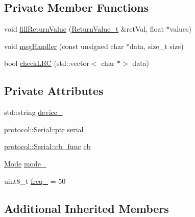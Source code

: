 \subsection*{Private Member Functions}
\begin{DoxyCompactItemize}
\item 
void \hyperlink{classo_cpt_1_1components_1_1sensors_1_1_razor_a1c058bfc9483cfcf94456d498bff380e}{fill\+Return\+Value} (\hyperlink{classo_cpt_1_1components_1_1sensors_1_1_razor_aab55c5b1a96ce97421e4696599549954}{Return\+Value\+\_\+t} \&ret\+Val, float $\ast$values)
\item 
void \hyperlink{classo_cpt_1_1components_1_1sensors_1_1_razor_a8d8e051113a86789851faca74d3da303}{msg\+Handler} (const unsigned char $\ast$data, size\+\_\+t size)
\item 
bool \hyperlink{classo_cpt_1_1components_1_1sensors_1_1_razor_a0905dcac63406a3885fa8c2d0e952a39}{check\+L\+RC} (std\+::vector$<$ char $\ast$$>$ data)
\end{DoxyCompactItemize}
\subsection*{Private Attributes}
\begin{DoxyCompactItemize}
\item 
std\+::string \hyperlink{classo_cpt_1_1components_1_1sensors_1_1_razor_af566e421b9ea1378e19cffd6bd743860}{device\+\_\+}
\item 
\hyperlink{classo_cpt_1_1protocol_1_1_serial_a4c97c6a2456d649974e07a186f634780}{protocol\+::\+Serial\+::ptr} \hyperlink{classo_cpt_1_1components_1_1sensors_1_1_razor_af9d445b2a06bbe42bb965c0e42b711df}{serial\+\_\+}
\item 
\hyperlink{classo_cpt_1_1protocol_1_1_serial_ad55591180be8bea2fe3832b1265b7496}{protocol\+::\+Serial\+::cb\+\_\+func} \hyperlink{classo_cpt_1_1components_1_1sensors_1_1_razor_a3fc69162ed59373f966458f2a5e30311}{cb}
\item 
\hyperlink{classo_cpt_1_1components_1_1sensors_1_1_razor_afed258e485aaaf9193a57d649ccb159b}{Mode} \hyperlink{classo_cpt_1_1components_1_1sensors_1_1_razor_aa6610c4127d6fa300a5e2b5fa3eca461}{mode\+\_\+}
\item 
uint8\+\_\+t \hyperlink{classo_cpt_1_1components_1_1sensors_1_1_razor_a7b71014d6a35c9b9f24b636bd3f6471c}{freq\+\_\+} = 50
\end{DoxyCompactItemize}
\subsection*{Additional Inherited Members}


